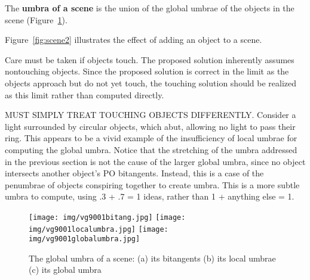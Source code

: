 \documentclass[9pt,twocolumn]{article}
\newif\ifTalk
\begin{document}
\ifTalk
We are computing dawns and sunsets, where the light (sun) appears or disappears
over the horizon of an object.
(just as, when flying around the Earth in an airplane, one may pass into night
but then, as you continue travelling, pass back into day).
\fi

The {\bf umbra of a scene} is the union of the global umbrae of the
objects in the scene (Figure~\ref{fig:scene1}).

Figure~\ref{fig:scene2} illustrates the effect of adding an object to a scene.



\begin{rmk}
Care must be taken if objects touch.
The proposed solution inherently assumes nontouching objects.
Since the proposed solution is correct in the limit as the objects approach
but do not yet touch, the touching solution should be realized as this
limit rather than computed directly.

MUST SIMPLY TREAT TOUCHING OBJECTS DIFFERENTLY.
Consider a light surrounded by circular objects, which abut, allowing no
light to pass their ring.
This appears to be a vivid example of the insufficiency of local umbrae for computing
the global umbra.
Notice that the stretching of the umbra addressed in the previous section
is not the cause of the larger global umbra, since no object intersects
another object's PO bitangents.
Instead, this is a case of the penumbrae of objects conspiring together
to create umbra.
This is a more subtle umbra to compute, using .3 + .7 = 1 ideas,
rather than 1 + anything else = 1.
\end{rmk}

\begin{figure}
\begin{center}
\texttt{[image: img/vg9001bitang.jpg]}
\texttt{[image: img/vg9001localumbra.jpg]}
\texttt{[image: img/vg9001globalumbra.jpg]}
\end{center}
\caption{The global umbra of a scene: (a) its bitangents (b) its local umbrae (c) its global umbra}
\label{fig:scene1}
\end{figure}
\end{document}
